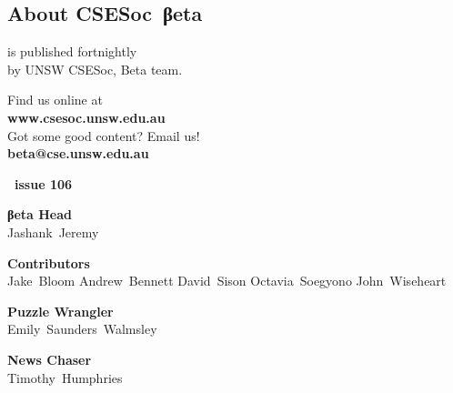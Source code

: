 \documentclass[twoside]{article}
\date{11 May 2015}
\makeatletter
\gdef\the@year{2015}
\gdef\the@issue{106}
\makeatother
\begin{document}

\newpage
\maketitle\thispagestyle{mag}
\begin{multicols}{2}\begingroup
\section*{About CSE{}Soc~βeta}\begin{center}
\csesocbeta{} is published fortnightly\\
by UNSW CSESoc, Beta team.
\par Find us online at\\
\textbf{www.csesoc.unsw.edu.au}\\
Got some good content? Email us!\\
\textbf{beta@cse.unsw.edu.au}\\
\vspace{1em}\par
{\Large\bf\makeatletter \the@year\ issue \the@issue}
\par{\bf\sffamily βeta Head}\\ Jashank~Jeremy
\par{\bf\sffamily Contributors}\\
  Jake~Bloom\hsp{}
  Andrew~Bennett\hsp{}
  David~Sison\hsp{}
  Octavia~Soegyono\hsp{}
  John~Wiseheart\hsp{}
\par{\bf\sffamily Puzzle Wrangler}\\ Emily~Saunders~Walmsley
\par{\bf\sffamily News Chaser}\\ Timothy~Humphries
\end{center}

\vfill\malcontents\raggedcolumns\columnbreak
\endgroup\raggedcolumns


\end{multicols}
\end{document}
